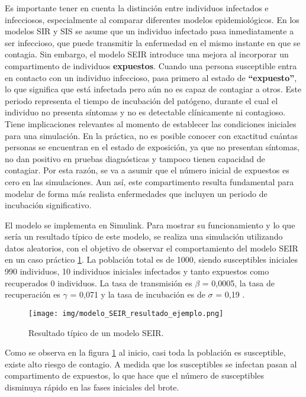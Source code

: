 Es importante tener en cuenta la distinción entre individuos infectados e infecciosos, especialmente al comparar diferentes modelos epidemiológicos. En los modelos SIR y SIS se asume que un individuo infectado pasa inmediatamente a ser infeccioso, que puede transmitir la enfermedad en el mismo instante en que se contagia. 
Sin embargo, el modelo SEIR introduce una mejora al incorporar un compartimento de individuos \textbf{expuestos}. Cuando una persona susceptible entra en contacto con un individuo infeccioso, pasa primero al estado de \textbf{“expuesto”}, lo que significa que está infectada pero aún no es capaz de contagiar a otros. Este periodo representa el tiempo de incubación del patógeno, durante el cual el individuo no presenta síntomas y no es detectable clínicamente ni contagioso.
Tiene implicaciones relevantes al momento de establecer las condiciones iniciales para una simulación. 
En la práctica, no es posible conocer con exactitud cuántas personas se encuentran en el estado de exposición, ya que no presentan síntomas, no dan positivo en pruebas diagnósticas y tampoco tienen capacidad de contagiar.
Por esta razón, se va a asumir que el número inicial de expuestos es cero en las simulaciones. Aun así, este compartimento resulta fundamental para modelar de forma más realista enfermedades que incluyen un periodo de incubación significativo.


El modelo se implementa en Simulink. Para mostrar su funcionamiento y lo que sería un resultado típico de este modelo, se realiza una simulación utilizando datos aleatorios, con el objetivo de observar el comportamiento del modelo SEIR en un caso práctico \ref{fig:eje SEIR}. La población total es de 1000, siendo susceptibles iniciales 990 individuos, 10 individuos iniciales infectados y tanto expuestos como recuperados 0 individuos.
La tasa de transmisión es $\beta$ = 0,0005, la tasa de recuperación es $\gamma$ = 0,071 y la tasa de incubación es de $\sigma$ = 0,19 .

\begin{figure}[H]
    \centering
    \texttt{[image: img/modelo\_SEIR\_resultado\_ejemplo.png]}
    \caption{Resultado típico de un modelo SEIR.}
    \label{fig:eje SEIR}
    \vspace{0.5cm} %
\end{figure}

Como se observa en la figura \ref{fig:eje SEIR} al inicio, casi toda la población es susceptible, existe alto riesgo de contagio. A medida que los susceptibles se infectan pasan al compartimento de expuestos, lo que hace que el número de susceptibles disminuya rápido en las fases iniciales del brote.

